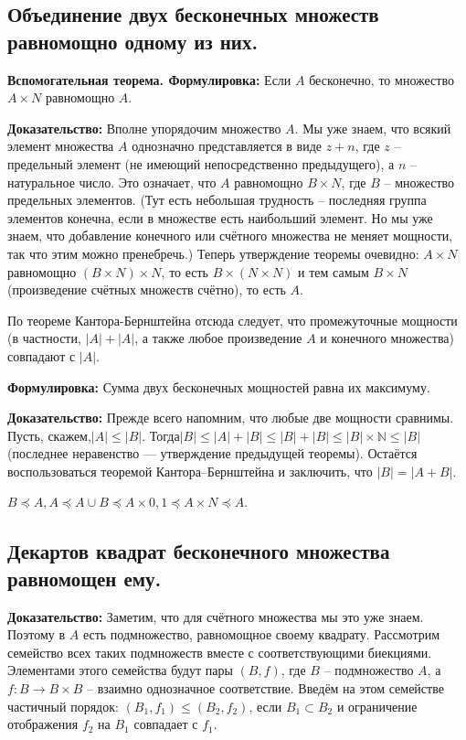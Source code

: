 \subsection{Объединение двух бесконечных множеств равномощно одному из них.}

\textbf{Вспомогательная теорема. Формулировка:}  Если $A$ бесконечно, то множество $A \times N$ равномощно $A$.

\textbf{Доказательство:} Вполне упорядочим множество $A$. Мы уже знаем, что всякий элемент множества $A$  однозначно представляется в виде $z + n$, где $z$ --  предельный элемент (не имеющий непосредственно предыдущего), а $n$ -- натуральное число. Это означает, что $A$ равномощно $B \times N$, где $B$ -- множество предельных элементов. (Тут есть небольшая трудность --  последняя группа элементов конечна, если в множестве есть наибольший элемент. Но мы уже знаем, что добавление конечного или счётного множества не меняет мощности, так что этим можно пренебречь.) Теперь утверждение теоремы очевидно: $A \times N$ равномощно $(B \times N) \times N$, то есть $B \times (N \times N)$ и тем самым $B \times N$ (произведение счётных множеств счётно), то есть $A$.

По теореме Кантора-Бернштейна отсюда следует, что промежуточные мощности (в частности, $|A|+|A|$, а также любое произведение $A$ и конечного множества) совпадают с $|A|$.

\textbf{Формулировка: } Сумма двух бесконечных мощностей равна их максимуму. 

\textbf{Доказательство: } Прежде всего напомним, что любые две мощности сравнимы. Пусть, скажем,$|A| \leq |B|$. Тогда$|B| \leq |A|+|B| \leq |B|+|B| \leq |B| \times \mathbb{N} \leq |B|$ (последнее неравенство — утверждение предыдущей теоремы). Остаётся воспользоваться теоремой Кантора–Бернштейна и заключить, что $|B|=|A + B|$.

$B \preceq A, A \preceq A \cup B \preceq A \times {0, 1} \preceq A \times N \preceq A$.

\subsection{Декартов квадрат бесконечного множества равномощен ему.}

\textbf{Доказательство: } Заметим, что для счётного множества мы это уже знаем. Поэтому в $A$ есть подмножество, равномощное своему квадрату. Рассмотрим семейство всех таких подмножеств вместе с соответствующими биекциями. Элементами этого семейства будут пары $(B, f)$, где $B$ -- подмножество $A$, а $f: B \to B \times B$ -- взаимно однозначное соответствие. Введём на этом семействе частичный порядок: $(B_1, f_1) \leq (B_2, f_2)$, если $B_1 \subset B_2$ и ограничение отображения $f_2$ на $B_1$ совпадает с $f_1$.

